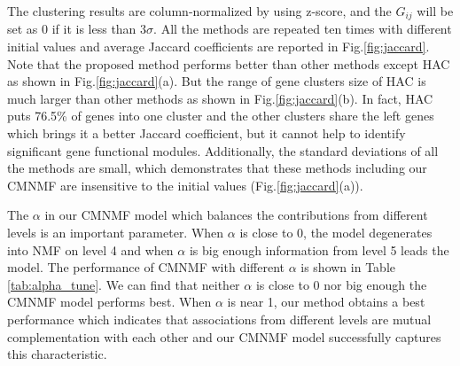 \documentclass{bmcart}
\begin{document}
The clustering results are column-normalized by using z-score, and the $G_{ij}$ will be set as 0 if it is less than $3\sigma$. All the methods are repeated ten times with different initial values and average Jaccard coefficients are reported in Fig.\ref{fig:jaccard}. Note that the proposed method performs better than other methods except HAC as shown in Fig.\ref{fig:jaccard}(a). But the range of gene clusters size of HAC is much larger than other methods as shown in Fig.\ref{fig:jaccard}(b). In fact, HAC puts 76.5\% of genes into one cluster and the other clusters share the left genes which brings it a better Jaccard coefficient, but it cannot help to identify significant gene functional modules. Additionally, the standard deviations of all the methods are small, which demonstrates that these methods including our CMNMF are insensitive to the initial values (Fig.\ref{fig:jaccard}(a)).

The $\alpha$ in our CMNMF model which balances the contributions from different levels is an important parameter. When $\alpha$ is close to 0, the model degenerates into NMF on level 4 and when $\alpha$ is big enough information from level 5 leads the model. The performance of CMNMF with different $\alpha$ is shown in Table \ref{tab:alpha_tune}. We can find that neither $\alpha$ is close to 0 nor big enough the CMNMF model performs best. When $\alpha$ is near 1, our method obtains a best performance which indicates that associations from different levels are mutual complementation with each other and our CMNMF model successfully captures this characteristic.
\end{document}
